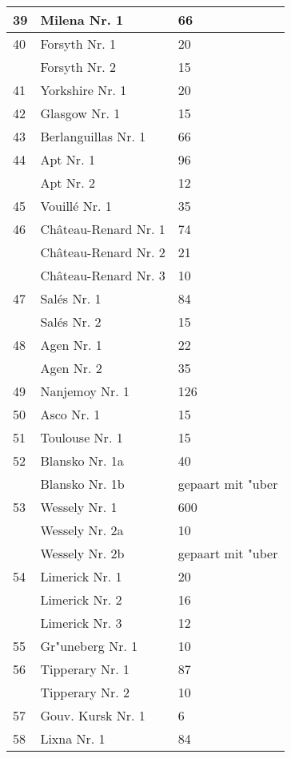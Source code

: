 \documentclass[a4paper, 11pt, oneside, polutonikogreek, german]{article}
\begin{document}
\begin{center}
\begin{longtable}{|l|l|l|}
        39 & Milena Nr. 1 & 66 \\ \hline
        40 & Forsyth Nr. 1 & 20 \\ \hline
          & Forsyth Nr. 2 & 15 \\ \hline
        41 & Yorkshire Nr. 1 & 20 \\ \hline
        42 & Glasgow Nr. 1 & 15 \\ \hline
        43 & Berlanguillas Nr. 1 & 66 \\ \hline
        44 & Apt Nr. 1 & 96 \\ \hline
          & Apt Nr. 2 & 12 \\ \hline
        45 & Vouillé Nr. 1 & 35 \\ \hline
        46 & Château-Renard Nr. 1 & 74 \\ \hline
          & Château-Renard Nr. 2 & 21 \\ \hline
          & Château-Renard Nr. 3 & 10 \\ \hline
        47 & Salés Nr. 1 & 84 \\ \hline
          & Salés Nr. 2 & 15 \\ \hline
        48 & Agen Nr. 1 & 22 \\ \hline
          & Agen Nr. 2 & 35 \\ \hline
        49 & Nanjemoy Nr. 1 & 126 \\ \hline
        50 & Asco Nr. 1 & 15 \\ \hline
        51 & Toulouse Nr. 1 & 15 \\ \hline
        52 & Blansko Nr. 1a & 40 \\ \hline
          & Blansko Nr. 1b & gepaart mit "uber \\ \hline
        53 & Wessely Nr. 1 & 600 \\ \hline
          & Wessely Nr. 2a & 10 \\ \hline
          & Wessely Nr. 2b & gepaart mit "uber \\ \hline
        54 & Limerick Nr. 1 & 20 \\ \hline
          & Limerick Nr. 2 & 16 \\ \hline
          & Limerick Nr. 3 & 12 \\ \hline
        55 & Gr"uneberg Nr. 1 & 10 \\ \hline
        56 & Tipperary Nr. 1 & 87 \\ \hline
          & Tipperary Nr. 2 & 10 \\ \hline
        57 & Gouv. Kursk Nr. 1 & 6 \\ \hline
        58 & Lixna Nr. 1 & 84 \\ \hline

\end{longtable}
\end{center}
\end{document}
